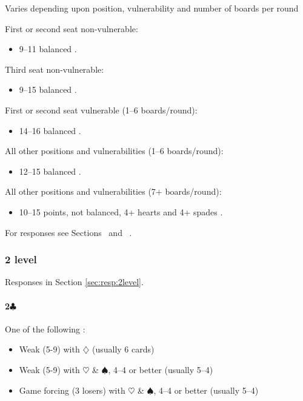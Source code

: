 \documentclass[a4paper,14pt]{extarticle}
\begin{document}
Varies depending upon position, vulnerability and number of boards per round

First or second seat non-vulnerable:
\begin{itemize}
\item 9--11 balanced .
\end{itemize}

Third seat non-vulnerable:
\begin{itemize}
\item 9--15 balanced .
\end{itemize}

First or second seat vulnerable (1--6 boards/round):
\begin{itemize}
\item 14--16 balanced .
\end{itemize}

All other positions and vulnerabilities (1--6 boards/round):
\begin{itemize}
\item 12--15 balanced .
\end{itemize}

All other positions and vulnerabilities (7+ boards/round):
\begin{itemize}
\item 10--15 points, not balanced, 4+ hearts and 4+ spades .
\end{itemize}

For responses see Sections~ and ~.

\newpage 

\subsubsection{2 level}
\label{sec:open:2level}

Responses in Section \ref{sec:resp:2level}.

\paragraph{2$\clubsuit$}
One of the following :
\begin{itemize}
\item Weak (5-9) with $\diamondsuit$ (usually 6 cards)
\item Weak (5-9) with $\heartsuit$ \& $\spadesuit$, 4--4 or better (usually 5--4)
\item Game forcing (3 losers) with $\heartsuit$ \& $\spadesuit$, 4--4 or better (usually 5--4)
\end{itemize}
\end{document}
